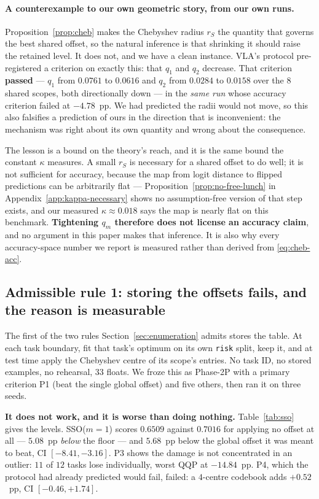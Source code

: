 \paragraph{A counterexample to our own geometric story, from our own runs.}
Proposition~\ref{prop:cheb} makes the Chebyshev radius $r_S$ the quantity that
governs the best shared offset, so the natural inference is that shrinking it
should raise the retained level. It does not, and we have a clean instance.
VLA's protocol pre-registered a criterion on exactly this: that $q_1$ and $q_2$
decrease. That criterion \textbf{passed} --- $q_1$ from $0.0761$ to $0.0616$ and
$q_2$ from $0.0284$ to $0.0158$ over the $8$ shared scopes, both directionally down
--- in the \emph{same run} whose accuracy criterion failed at $-4.78$~pp. We had
predicted the radii would not move, so this also falsifies a prediction of ours in
the direction that is inconvenient: the mechanism was right about its own quantity
and wrong about the consequence.

The lesson is a bound on the theory's reach, and it is the same bound the constant
$\kappa$ measures. A small $r_S$ is necessary for a shared offset to do well; it is
not sufficient for accuracy, because the map from logit distance to flipped
predictions can be arbitrarily flat --- Proposition~\ref{prop:no-free-lunch} in
Appendix~\ref{app:kappa-necessary} shows no assumption-free version of that step
exists, and our measured $\kappa\approx0.018$ says the map is nearly flat on this
benchmark. \textbf{Tightening $q_m$ therefore does not license an accuracy claim},
and no argument in this paper makes that inference. It is also why every
accuracy-space number we report is measured rather than derived from
\eqref{eq:cheb-acc}.

\subsection{Admissible rule 1: storing the offsets fails, and the reason is measurable}
\label{sec:sso}

The first of the two rules Section~\ref{sec:enumeration} admits stores the table.
At each task boundary, fit that task's optimum on its own \texttt{risk} split,
keep it, and at test time apply the Chebyshev centre of its scope's entries. No
task ID, no stored examples, no rehearsal, $33$ floats. We froze this as Phase-2P
with a primary criterion P1 (beat the single global offset) and five others, then
ran it on three seeds.

\textbf{It does not work, and it is worse than doing nothing.}
Table~\ref{tab:sso} gives the levels. SSO($m{=}1$) scores $0.6509$ against
$0.7016$ for applying no offset at all --- $5.08$~pp \emph{below} the floor --- and
$5.68$~pp below the global offset it was meant to beat, CI $[-8.41,-3.16]$. P3
shows the damage is not concentrated in an outlier: $11$ of $12$ tasks lose
individually, worst QQP at $-14.84$~pp. P4, which the protocol had already
predicted would fail, failed: a $4$-centre codebook adds $+0.52$~pp, CI
$[-0.46,+1.74]$.

